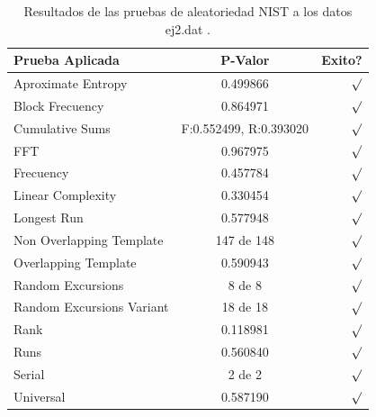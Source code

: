 \documentclass[10pt]{IEEEtran}
\begin{document}
\begin{table}[H]
\caption{Resultados de las pruebas de aleatoriedad NIST a los datos ej2.dat .}
\label{caso1}
\begin{center}
\begin{small}
\begin{tabular}{|l|c|r|}
\hline

Prueba Aplicada &  P-Valor & Exito? \\
\hline

Aproximate Entropy    &    0.499866  & $\surd$ \\

Block Frecuency  & 0.864971 &  $\surd$  \\

Cumulative Sums    &   F:0.552499, R:0.393020  & $\surd$ \\

FFT    &   0.967975 &  $\surd$     \\

Frecuency     & 0.457784  &  $\surd$   \\

Linear Complexity      & 0.330454 & $\surd$ \\

Longest Run      &  0.577948 &    $\surd$      \\

Non Overlapping Template      & 147 de 148    &     $\surd$          \\

Overlapping Template      &  0.590943   &      $\surd$      \\

Random Excursions      & 8 de 8  &    $\surd$      \\

Random Excursions Variant & 18 de 18 &     $\surd$    \\

Rank &  0.118981 &      $\surd$      \\

Runs &    0.560840 &     $\surd$        \\

Serial &     2 de 2    &     $\surd$        \\

Universal &     0.587190 &   $\surd$            \\

\hline

\end{tabular}
\end{small}
\end{center}
\end{table}
\end{document}
